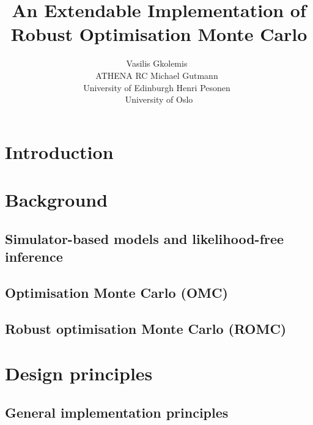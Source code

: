 \documentclass[article]{jss}
\author{Vasilis Gkolemis~\orcidlink{0000-0002-2636-0245}\\ATHENA RC \And
  Michael Gutmann~\orcidlink{0000-0002-5329-9910}\\University of Edinburgh \And
  Henri Pesonen~\orcidlink{0000-0003-4500-2926}\\University of Oslo
}
\title{An Extendable \proglang{Python} Implementation of Robust Optimisation Monte Carlo}
\begin{document}
\section{Introduction} \label{sec:intro}


\section{Background}


\subsection{Simulator-based models and likelihood-free inference}


\subsection{Optimisation Monte Carlo (OMC)}


\subsection{Robust optimisation Monte Carlo (ROMC)}


\subsection[Engine for likelihood-free inference (ELFI)]{}
\label{subsec:ELFI}


\section{Design principles}  %


\subsection{General implementation principles}
\label{subsec:general_design}

\end{document}

